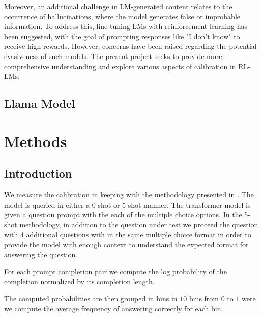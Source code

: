 \documentclass[11pt]{article}
\begin{document}
Moreover, an additional challenge in LM-generated content relates to the occurrence of hallucinations, where the model generates false or improbable information. To address this, fine-tuning LMs with reinforcement learning has been suggested, with the goal of prompting responses like "I don't know" to receive high rewards. However, concerns have been raised regarding the potential evasiveness of such models. The present project seeks to provide more comprehensive understanding and explore various aspects of calibration in RL-LMs.


\subsection{Llama Model}




\section{Methods}

\subsection{Introduction}

We measure the calibration in keeping with the methodology presented 
in  \cite{kadavath2022language}. The model is queried in either a
0-shot or 5-shot manner. The transformer model is given a question 
prompt  with the each of the multiple choice options.  In the 5-shot 
methodology, in addition to the question under test we proceed the 
question with 4 additional questions with in the same multiple 
choice format in order to provide the model with enough context to 
understand the expected format for answering the question.

For each prompt completion pair we compute the log probability of 
the completion normalized by its completion length. 


The computed probabilities are then grouped in bins in $10$ bins from 
$0$ to $1$ were we compute the average frequency of answering 
correctly for each bin. 
\end{document}
